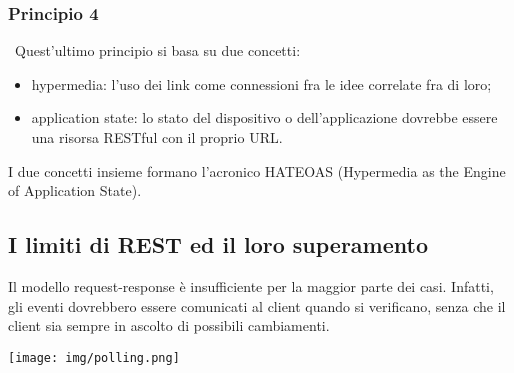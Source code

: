 \documentclass{article}
\begin{document}
\subsubsection{Principio 4}\
Quest'ultimo principio si basa su due concetti:
\begin{itemize}
    \item hypermedia: l'uso dei link come connessioni fra le idee correlate fra di loro;
    \item application state: lo stato del dispositivo o dell'applicazione dovrebbe essere una risorsa RESTful con il proprio URL.
\end{itemize}
I due concetti insieme formano l'acronico HATEOAS (Hypermedia as the Engine of Application State).
\subsection{I limiti di REST ed il loro superamento}
Il modello request-response è insufficiente per la maggior parte dei casi. Infatti, gli eventi dovrebbero essere comunicati al client quando si verificano, senza che il client sia sempre in ascolto di possibili cambiamenti.
\begin{center}
\texttt{[image: img/polling.png]}
\end{center}
\end{document}
